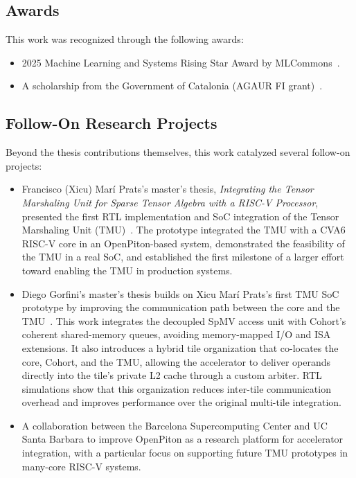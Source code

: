 \subsection{Awards} \label{sec:awards}

This work was recognized through the following awards:
\begin{itemize}
\item 2025 Machine Learning and Systems Rising Star Award by MLCommons~\cite{mlcommons2025risingstars}.
\item A scholarship from the Government of Catalonia (AGAUR FI grant)~\cite{agaur2026grants}.
\end{itemize}

\subsection{Follow-On Research Projects} \label{sec:follow-on-research-projects}
Beyond the thesis contributions themselves, this work catalyzed several follow-on projects:
\begin{itemize}
\item Francisco (Xicu) Marí Prats's master's thesis, \textit{Integrating the Tensor Marshaling Unit for Sparse Tensor Algebra with a RISC-V Processor}, presented the first RTL implementation and SoC integration of the Tensor Marshaling Unit (TMU)~\cite{mariprats2025mastersthesis}. The prototype integrated the TMU with a CVA6 RISC-V core in an OpenPiton-based system, demonstrated the feasibility of the TMU in a real SoC, and established the first milestone of a larger effort toward enabling the TMU in production systems.
\item Diego Gorfini's master's thesis builds on Xicu Marí Prats's first TMU SoC prototype by improving the communication path between the core and the TMU~\cite{mariprats2026bscsymposium}. This work integrates the decoupled SpMV access unit with Cohort's coherent shared-memory queues, avoiding memory-mapped I/O and ISA extensions. It also introduces a hybrid tile organization that co-locates the core, Cohort, and the TMU, allowing the accelerator to deliver operands directly into the tile's private L2 cache through a custom arbiter. RTL simulations show that this organization reduces inter-tile communication overhead and improves performance over the original multi-tile integration.
\item A collaboration between the Barcelona Supercomputing Center and UC Santa Barbara to improve OpenPiton as a research platform for accelerator integration, with a particular focus on supporting future TMU prototypes in many-core RISC-V systems.
\end{itemize}

